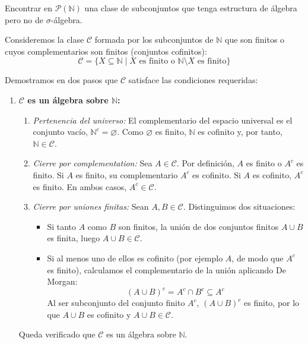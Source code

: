 \begin{problema}
Encontrar en $\mathcal{P}(\mathbb{N})$ una clase de subconjuntos que tenga estructura de álgebra pero no de $\sigma$-álgebra.

\tcblower

Consideremos la clase $\mathcal{C}$ formada por los subconjuntos de $\mathbb{N}$ que son finitos o cuyos complementarios son finitos (conjuntos cofinitos):
\[
    \mathcal{C} = \{ X \subseteq \mathbb{N} \mid X \text{ es finito o } \mathbb{N} \setminus X \text{ es finito} \}
\]

Demostramos en dos pasos que $\mathcal{C}$ satisface las condiciones requeridas:

\begin{enumerate}
    \item \textbf{$\mathcal{C}$ es un álgebra sobre $\mathbb{N}$:}
    \begin{enumerate}[label=\arabic*.]
        \item \textit{Pertenencia del universo:} El complementario del espacio universal es el conjunto vacío, $\mathbb{N}^c = \varnothing$. Como $\varnothing$ es finito, $\mathbb{N}$ es cofinito y, por tanto, $\mathbb{N} \in \mathcal{C}$.
        \item \textit{Cierre por complementation:} Sea $A \in \mathcal{C}$. Por definición, $A$ es finito o $A^c$ es finito. Si $A$ es finito, su complementario $A^c$ es cofinito. Si $A$ es cofinito, $A^c$ es finito. En ambos casos, $A^c \in \mathcal{C}$.
        \item \textit{Cierre por uniones finitas:} Sean $A, B \in \mathcal{C}$. Distinguimos dos situaciones:
        \begin{itemize}
            \item Si tanto $A$ como $B$ son finitos, la unión de dos conjuntos finitos $A \cup B$ es finita, luego $A \cup B \in \mathcal{C}$.
            \item Si al menos uno de ellos es cofinito (por ejemplo $A$, de modo que $A^c$ es finito), calculamos el complementario de la unión aplicando De Morgan:
            \[
                (A \cup B)^c = A^c \cap B^c \subseteq A^c
            \]
            Al ser subconjunto del conjunto finito $A^c$, $(A \cup B)^c$ es finito, por lo que $A \cup B$ es cofinito y $A \cup B \in \mathcal{C}$.
        \end{itemize}
    \end{enumerate}
    Queda verificado que $\mathcal{C}$ es un álgebra sobre $\mathbb{N}$.


\end{enumerate}
\end{problema}
